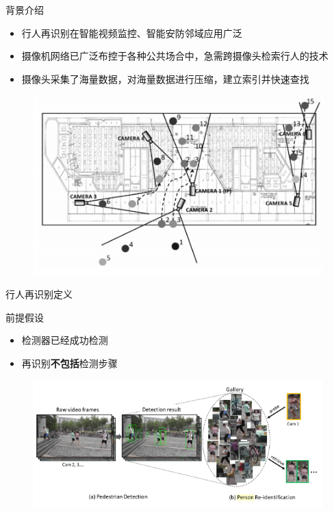 \documentclass[notes]{beamer}
\newcommand{\hei}{\CJKfamily{hei}}
\begin{document}
\begin{frame}
	{背景介绍}
	\begin{itemize}
		\item 行人再识别在智能视频监控、智能安防邻域应用广泛
		\item 摄像机网络已广泛布控于各种公共场合中，急需{\hei 跨摄像头}检索行人的技术
		\item 摄像头采集了{\hei 海量}数据，对海量数据进行压缩，建立索引并快速查找
	\end{itemize}
	\begin{figure}
		\includegraphics[width=0.75\linewidth]{2018-03-07-19-33-13.png}
	\end{figure}
\end{frame}


\begin{frame}
	{行人再识别定义}
	\begin{block}{前提假设}
		\begin{itemize}
			\item 检测器已经成功检测
			\item 再识别{\bf 不包括}检测步骤
		\end{itemize}
	\end{block}
	\begin{figure}
		\includegraphics[width=1\linewidth]{2018-03-07-19-55-19.png}
	\end{figure}
\end{frame}
		
\end{document}
